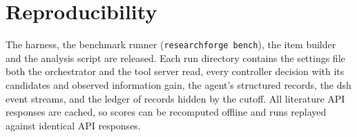\section{Reproducibility}\label{app:repro}
The harness, the benchmark runner (\texttt{researchforge bench}), the item builder and the analysis script are released. Each run directory contains the settings file both the orchestrator and the tool server read, every controller decision with its candidates and observed information gain, the agent's structured records, the dsh event streams, and the ledger of records hidden by the cutoff. All literature API responses are cached, so scores can be recomputed offline and runs replayed against identical API responses.

